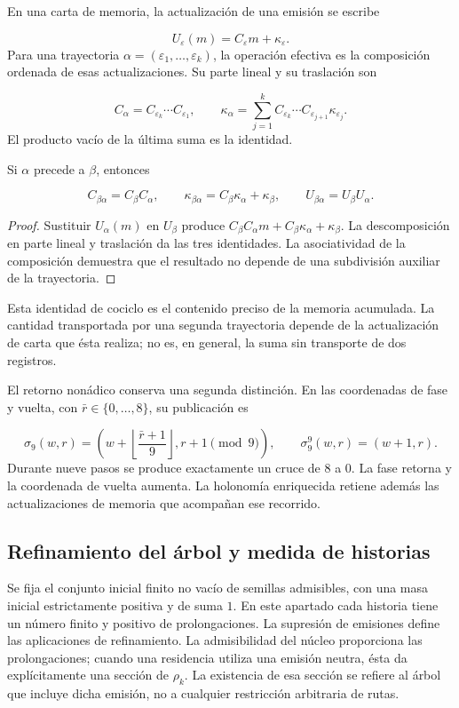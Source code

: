En una carta de memoria, la actualización de una emisión se escribe

\[
U_\varepsilon(m)=C_\varepsilon m+\kappa_\varepsilon.
\]
Para una trayectoria \(\alpha=(\varepsilon_1,\ldots,\varepsilon_k)\), la operación efectiva es la composición ordenada de esas actualizaciones. Su parte lineal y su traslación son

\[
C_\alpha=C_{\varepsilon_k}\cdots C_{\varepsilon_1},
\qquad
\kappa_\alpha=
\sum_{j=1}^{k}C_{\varepsilon_k}\cdots
C_{\varepsilon_{j+1}}\kappa_{\varepsilon_j}.
\]
El producto vacío de la última suma es la identidad.

\begin{proposition}
\label{x_reciprocidad:iv:cont:concatenacion}
Si \(\alpha\) precede a \(\beta\), entonces

\[
C_{\beta\alpha}=C_\beta C_\alpha,
\qquad
\kappa_{\beta\alpha}=C_\beta\kappa_\alpha+\kappa_\beta,
\qquad
U_{\beta\alpha}=U_\beta U_\alpha.
\]
\end{proposition}
\begin{proof}
Sustituir \(U_\alpha(m)\) en \(U_\beta\) produce \(C_\beta C_\alpha m+C_\beta\kappa_\alpha+\kappa_\beta\). La descomposición en parte lineal y traslación da las tres identidades. La asociatividad de la composición demuestra que el resultado no depende de una subdivisión auxiliar de la trayectoria.
\end{proof}

Esta identidad de cociclo es el contenido preciso de la memoria acumulada. La cantidad transportada por una segunda trayectoria depende de la actualización de carta que ésta realiza; no es, en general, la suma sin transporte de dos registros.

El retorno nonádico conserva una segunda distinción. En las coordenadas de fase y vuelta, con \(\bar r\in\{0,\ldots,8\}\), su publicación es

\[
\sigma_9(w,r)=
\left(w+\left\lfloor\frac{\bar r+1}{9}\right\rfloor,
r+1\pmod9\right),
\qquad
\sigma_9^9(w,r)=(w+1,r).
\]
Durante nueve pasos se produce exactamente un cruce de \(8\) a \(0\). La fase retorna y la coordenada de vuelta aumenta. La holonomía enriquecida retiene además las actualizaciones de memoria que acompañan ese recorrido.

\subsection{Refinamiento del árbol y medida de historias}
\label{x_reciprocidad:iv:cont:medida}
Se fija el conjunto inicial finito no vacío de semillas admisibles, con una masa inicial estrictamente positiva y de suma \(1\). En este apartado cada historia tiene un número finito y positivo de prolongaciones. La supresión de emisiones define las aplicaciones de refinamiento. La admisibilidad del núcleo proporciona las prolongaciones; cuando una residencia utiliza una emisión neutra, ésta da explícitamente una sección de \(\rho_k\). La existencia de esa sección se refiere al árbol que incluye dicha emisión, no a cualquier restricción arbitraria de rutas.

